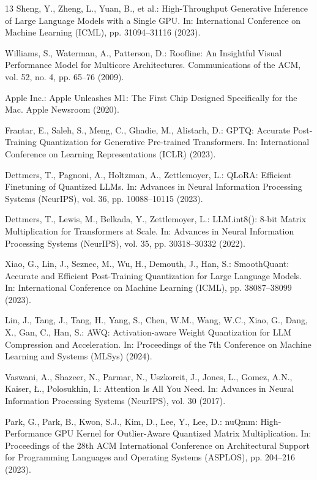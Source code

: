 \documentclass[runningheads,oribibl]{llncs}
\begin{document}
\begin{thebibliography}{13}
Sheng, Y., Zheng, L., Yuan, B., et al.: High-Throughput Generative Inference of Large Language Models with a Single GPU. In: International Conference on Machine Learning (ICML), pp. 31094--31116 (2023).

Williams, S., Waterman, A., Patterson, D.: Roofline: An Insightful Visual Performance Model for Multicore Architectures. Communications of the ACM, vol. 52, no. 4, pp. 65--76 (2009).

Apple Inc.: Apple Unleashes M1: The First Chip Designed Specifically for the Mac. Apple Newsroom (2020).

Frantar, E., Saleh, S., Meng, C., Ghadie, M., Alistarh, D.: GPTQ: Accurate Post-Training Quantization for Generative Pre-trained Transformers. In: International Conference on Learning Representations (ICLR) (2023).

Dettmers, T., Pagnoni, A., Holtzman, A., Zettlemoyer, L.: QLoRA: Efficient Finetuning of Quantized LLMs. In: Advances in Neural Information Processing Systems (NeurIPS), vol. 36, pp. 10088--10115 (2023).

Dettmers, T., Lewis, M., Belkada, Y., Zettlemoyer, L.: LLM.int8(): 8-bit Matrix Multiplication for Transformers at Scale. In: Advances in Neural Information Processing Systems (NeurIPS), vol. 35, pp. 30318--30332 (2022).

Xiao, G., Lin, J., Seznec, M., Wu, H., Demouth, J., Han, S.: SmoothQuant: Accurate and Efficient Post-Training Quantization for Large Language Models. In: International Conference on Machine Learning (ICML), pp. 38087--38099 (2023).

Lin, J., Tang, J., Tang, H., Yang, S., Chen, W.M., Wang, W.C., Xiao, G., Dang, X., Gan, C., Han, S.: AWQ: Activation-aware Weight Quantization for LLM Compression and Acceleration. In: Proceedings of the 7th Conference on Machine Learning and Systems (MLSys) (2024).

Vaswani, A., Shazeer, N., Parmar, N., Uszkoreit, J., Jones, L., Gomez, A.N., Kaiser, {\L}., Polosukhin, I.: Attention Is All You Need. In: Advances in Neural Information Processing Systems (NeurIPS), vol. 30 (2017).

Park, G., Park, B., Kwon, S.J., Kim, D., Lee, Y., Lee, D.: nuQmm: High-Performance GPU Kernel for Outlier-Aware Quantized Matrix Multiplication. In: Proceedings of the 28th ACM International Conference on Architectural Support for Programming Languages and Operating Systems (ASPLOS), pp. 204--216 (2023).


\end{thebibliography}
\end{document}
